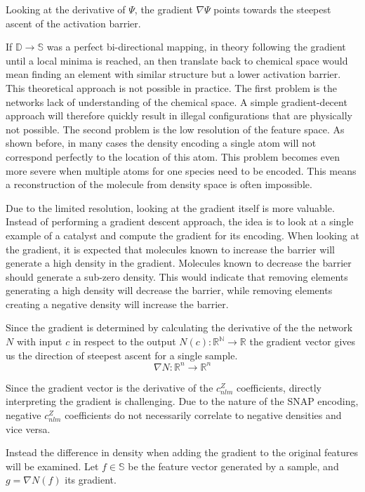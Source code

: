 Looking at the derivative of $\Psi$, the gradient $\nabla \Psi$ points towards the steepest ascent of the activation barrier.

If $\mathbb{D} \to \mathbb{S}$ was a perfect bi-directional mapping, in theory following the gradient until a local minima is reached,
an then translate back to chemical space would mean finding an element with similar structure but a lower activation barrier.
This theoretical approach is not possible in practice.
The first problem is the networks lack of understanding of the chemical space.
A simple gradient-decent approach will therefore quickly result in illegal configurations 
that are physically not possible.
The second problem is the low resolution of the feature space.
As shown before, in many cases the density encoding a single atom will not correspond perfectly to the location of this atom.
This problem becomes even more severe when multiple atoms for one species need to be encoded.
This means a reconstruction of the molecule from density space is often impossible.

Due to the limited resolution, looking at the gradient itself is more valuable.
Instead of performing a gradient descent approach, the idea is to look at a single example of a catalyst and compute the gradient for its encoding.
When looking at the gradient, it is expected that molecules known to increase the barrier will generate a high density in the gradient.
Molecules known to decrease the barrier should generate a sub-zero density.
This would indicate that removing elements generating a high density will decrease the barrier,
while removing elements creating a negative density will increase the barrier. %

Since the gradient is determined by calculating the derivative of the the network $N$ with input $c$ in respect to the output $N(c): \mathbb{R^N} \to \mathbb{R}$
the gradient vector gives us the direction of steepest ascent for a single sample.
$$
\nabla N: \mathbb{R}^n  \to \mathbb{R}^n 
$$

Since the gradient vector is the derivative of the $c_{nlm}^Z$ coefficients, 
directly interpreting the gradient is challenging. 
Due to the nature of the SNAP encoding, negative $c_{nlm}^Z$ coefficients do not necessarily correlate to negative densities and vice versa.

Instead the difference in density when adding the gradient to the original features will be examined.
Let $f \in \mathbb{S}$ be the feature vector generated by a sample, and $g = \nabla N(f)$ its gradient.

